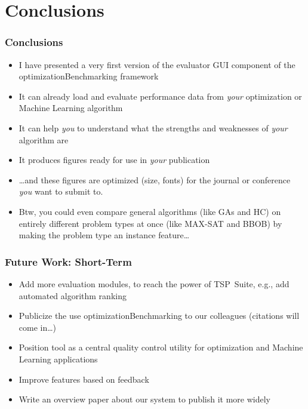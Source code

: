%
\section{Conclusions}%
%
\begin{frame}%
\frametitle{Conclusions}%
\begin{itemize}%
\item I have presented a very first version of the evaluator GUI component of the optimizationBenchmarking framework%
\item<2-> It can already load and evaluate performance data from \emph{your} optimization or Machine Learning algorithm%
\item<3-> It can help \emph{you} to understand what the strengths and weaknesses of \emph{your} algorithm are%
\item<4-> It produces figures ready for use in \emph{your} publication%
\item<5-> {\dots}and these figures are optimized (size, fonts) for the journal or conference \emph{you} want to submit to.%
\item<6-> Btw, you could even compare general algorithms (like GAs and HC) on entirely different problem types at once (like MAX-SAT and BBOB) by making the problem type an instance feature\dots%
\end{itemize}%
\end{frame}
%
%
\begin{frame}%
\frametitle{Future Work: Short-Term}%
\begin{itemize}%
\item Add more evaluation modules, to reach the power of TSP~Suite, e.g., add automated algorithm ranking%
\item<2-> Publicize the use optimizationBenchmarking to our colleagues (citations will come in\dots)%
\item<3-> Position tool as a central quality control utility for optimization and Machine Learning applications%
\item<4-> Improve features based on feedback%
\item<5-> Write an overview paper about our system to publish it more widely%
\end{itemize}%
\end{frame}
%
